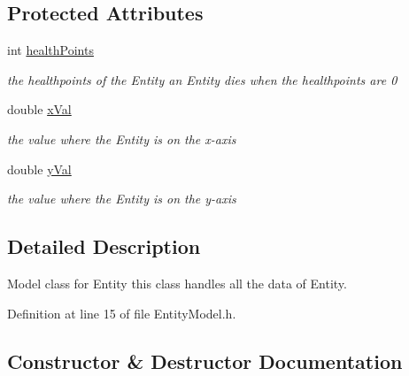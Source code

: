 \subsection*{Protected Attributes}
\begin{DoxyCompactItemize}
\item 
\mbox{\label{classEntity_1_1EntityModel_a975263695b038cb5d11218226526c734}} 
int \hyperlink{classEntity_1_1EntityModel_a975263695b038cb5d11218226526c734}{health\+Points}
\begin{DoxyCompactList}\small\item\em the healthpoints of the Entity an Entity dies when the healthpoints are 0 \end{DoxyCompactList}\item 
\mbox{\label{classEntity_1_1EntityModel_aac6eb5f2b4e0b953a104e6aac0de6f22}} 
double \hyperlink{classEntity_1_1EntityModel_aac6eb5f2b4e0b953a104e6aac0de6f22}{x\+Val}
\begin{DoxyCompactList}\small\item\em the value where the Entity is on the x-\/axis \end{DoxyCompactList}\item 
\mbox{\label{classEntity_1_1EntityModel_a1fe41ef38158ad18ef4dbc70ddf3358e}} 
double \hyperlink{classEntity_1_1EntityModel_a1fe41ef38158ad18ef4dbc70ddf3358e}{y\+Val}
\begin{DoxyCompactList}\small\item\em the value where the Entity is on the y-\/axis \end{DoxyCompactList}\end{DoxyCompactItemize}


\subsection{Detailed Description}
Model class for Entity this class handles all the data of Entity. 

Definition at line 15 of file Entity\+Model.\+h.



\subsection{Constructor \& Destructor Documentation}
\mbox{\label{classEntity_1_1EntityModel_a13d4ef395649df7741fc6f73e0993f82}} 
